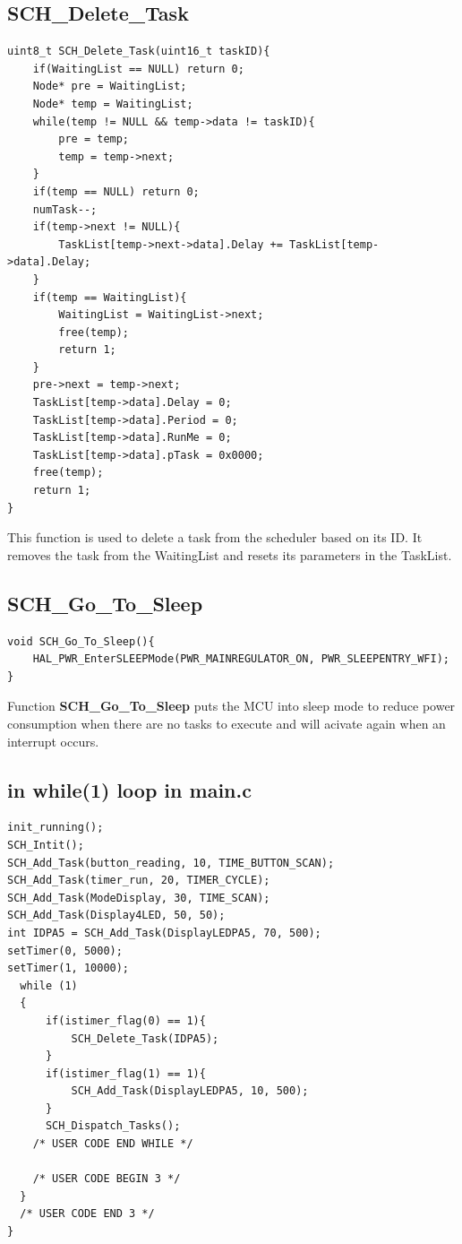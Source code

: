 \documentclass[twoside, final]{hcmut_report}
\begin{document}
\subsection{SCH\_Delete\_Task}

\begin{lstlisting}[basicstyle=\small, caption=An implementation of the ‘SCH\_Delete\_Task’ functions]
uint8_t SCH_Delete_Task(uint16_t taskID){
	if(WaitingList == NULL) return 0;
	Node* pre = WaitingList;
	Node* temp = WaitingList;
	while(temp != NULL && temp->data != taskID){
		pre = temp;
		temp = temp->next;
	}
	if(temp == NULL) return 0;
	numTask--;
	if(temp->next != NULL){
		TaskList[temp->next->data].Delay += TaskList[temp->data].Delay;
	}
	if(temp == WaitingList){
		WaitingList = WaitingList->next;
		free(temp);
		return 1;
	}
	pre->next = temp->next;
	TaskList[temp->data].Delay = 0;
	TaskList[temp->data].Period = 0;
	TaskList[temp->data].RunMe = 0;
	TaskList[temp->data].pTask = 0x0000;
	free(temp);
	return 1;
}
\end{lstlisting}

This function is used to delete a task from the scheduler based on its ID. It removes the task from the WaitingList and resets its parameters in the TaskList.

\subsection{SCH\_Go\_To\_Sleep}

\begin{lstlisting}[basicstyle=\small, caption=An implementation of the ‘watchdog’ functions]
void SCH_Go_To_Sleep(){
	HAL_PWR_EnterSLEEPMode(PWR_MAINREGULATOR_ON, PWR_SLEEPENTRY_WFI);
}
\end{lstlisting}

Function \textbf{SCH\_Go\_To\_Sleep} puts the MCU into sleep mode to reduce power consumption when there are no tasks to execute and will acivate again when an interrupt occurs.

\subsection{in while(1) loop in main.c}
\begin{lstlisting}[basicstyle=\small, caption=An implementation of the ‘watchdog’ functions]
init_running();
SCH_Intit();
SCH_Add_Task(button_reading, 10, TIME_BUTTON_SCAN);
SCH_Add_Task(timer_run, 20, TIMER_CYCLE);
SCH_Add_Task(ModeDisplay, 30, TIME_SCAN);
SCH_Add_Task(Display4LED, 50, 50);
int IDPA5 = SCH_Add_Task(DisplayLEDPA5, 70, 500);
setTimer(0, 5000);
setTimer(1, 10000);
  while (1)
  {
	  if(istimer_flag(0) == 1){
		  SCH_Delete_Task(IDPA5);
	  }
	  if(istimer_flag(1) == 1){
		  SCH_Add_Task(DisplayLEDPA5, 10, 500);
	  }
	  SCH_Dispatch_Tasks();
    /* USER CODE END WHILE */

    /* USER CODE BEGIN 3 */
  }
  /* USER CODE END 3 */
}
\end{lstlisting}
\end{document}
